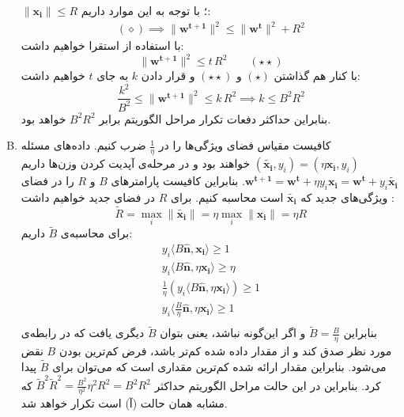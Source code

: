 \documentclass[a4paper, 12pt]{article}
\begin{document}
\begin{enumerate}[A)]
	$\|\bm{x_i}\| \le R$
	؛ با توجه به این موارد داریم:
	\[
	\begin{aligned}
		(\diamond) \implies \|\bm{w^{t+1}}\|^2 \le \|\bm{w^t}\|^2 + R^2 
	\end{aligned}
	\]
	با استفاده از استقرا خواهیم داشت:
	\[
	\|\bm{w^{t+1}}\|^2 \le t\,R^2 \qquad (\star\star)
	\]
	با کنار هم گذاشتن
	$(\star)$
	و
	$(\star\star)$
	و قرار دادن $k$ به جای $t$ خواهیم داشت:
	\[
	\frac{k^2}{B^2} \le \|\bm{w^{t+1}}\|^2 \le k\,R^2 \implies \boxed{k \le B^2R^2}
	\]
	بنابراین حداکثر دفعات تکرار مراحل الگوریتم برابر $B^2R^2$ خواهد بود.
	\item
	کافیست مقیاس فضای ویژگی‌ها را در $\frac{1}{\eta}$ ضرب کنیم. داده‌های مسئله
	$(\bm{\tilde{x_i}}, y_i) = (\eta\bm{x_i}, y_i)$
	خواهند بود و در مرحله‌ی آپدیت کردن وزن‌ها داریم
	$\bm{w^{t+1}} = \bm{w^t} + \eta y_i\bm{x_i} = \bm{w^t} + y_i\bm{\tilde{x_i}}$.
	بنابراین کافیست پارامتر‌های $B$ و $R$ را در فضای ویژگی‌های جدید که $\bm{\tilde{x_i}}$ است محاسبه کنیم. برای $R$ در فضای جدید خواهیم داشت :
	\[
	\tilde{R} = \max_i \|\bm{\tilde{x_i}}\| = \eta \max_i \|\bm{x_i}\| = \eta R
	\]
	برای محاسبه‌ی $\tilde{B}$ داریم:
	\[
	\begin{gathered}
		y_i\langle B\bm{\hat{n}}, \bm{x_i}\rangle \ge 1 \\
		y_i\langle B\bm{\hat{n}}, \eta\bm{x_i}\rangle \ge \eta \\
		\frac{1}{\eta}\left(y_i\langle B\bm{\hat{n}}, \eta\bm{x_i}\rangle\right) \ge 1 \\
		y_i\langle \frac{B}{\eta}\bm{\hat{n}}, \eta\bm{x_i}\rangle \ge 1 \\
	\end{gathered}
	\]
	بنابراین
	$\tilde{B} = \frac{B}{\eta}$
	و اگر این‌گونه نباشد، یعنی بتوان $\tilde{B}$ دیگری یافت که در رابطه‌ی مورد نظر صدق کند و از مقدار داده شده کم‌تر باشد، فرض کم‌ترین بودن $B$‌ نقض می‌شود. بنابراین مقدار ارائه شده کم‌ترین مقداری است که می‌توان برای $\tilde{B}$ پیدا کرد. بنابراین در این حالت مراحل الگوریتم حداکثر
	$\tilde{B}^2\tilde{R}^2 = \frac{B^2}{\eta^2}\eta^2R^2 = B^2R^2$
	که مشابه همان حالت (آ) است تکرار خواهد شد.
\end{enumerate}
\pagebreak
\end{document}
